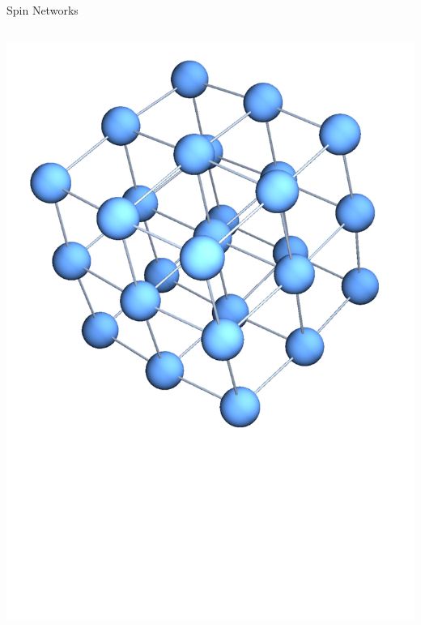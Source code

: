 \documentclass{beamer}
\begin{document}
\begin{frame}[t]{Spin Networks}
\begin{columns}[T]
\begin{column}{0.33\textwidth}
    		\includegraphics[trim=0 0 0 -10mm, width=\textwidth]{Images/chain3_cubic}\\

\end{column}
\end{columns}
\end{frame}
\end{document}

